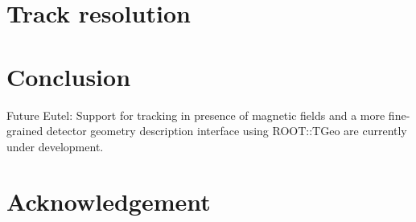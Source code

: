 \documentclass[a4paper,10pt]{scrartcl}
\begin{document}
\section{Track resolution}
\label{sec:trackres}


\section{Conclusion}

Future Eutel:
Support for tracking in presence of magnetic fields and a more fine-grained detector geometry description interface using ROOT::TGeo are currently under development.

\section*{Acknowledgement}

\small


\end{document}
